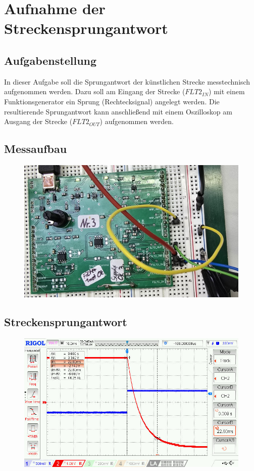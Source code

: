 \documentclass[twoside]{article}
\begin{document}
\newpage
\section{Aufnahme der Streckensprungantwort}
\subsection{Aufgabenstellung}
In dieser Aufgabe soll die Sprungantwort der künstlichen Strecke messtechnisch aufgenommen werden. Dazu soll am Eingang der Strecke ($FLT2_{IN}$) mit einem Funktionsgenerator ein Sprung (Rechtecksignal) angelegt werden. Die resultierende Sprungantwort kann anschließend mit einem Oszilloskop am Ausgang der Strecke ($FLT2_{OUT}$) aufgenommen werden.

\subsection{Messaufbau}
\begin{figure}[h]
    \centering
    \includegraphics[width=0.75\linewidth]{img/Aufbau_03.jpg}
\end{figure}

\subsection{Streckensprungantwort}
\begin{figure}[h]
    \centering
    \includegraphics[width=0.75\linewidth]{img/Messung_01.png}
\end{figure}
\end{document}
